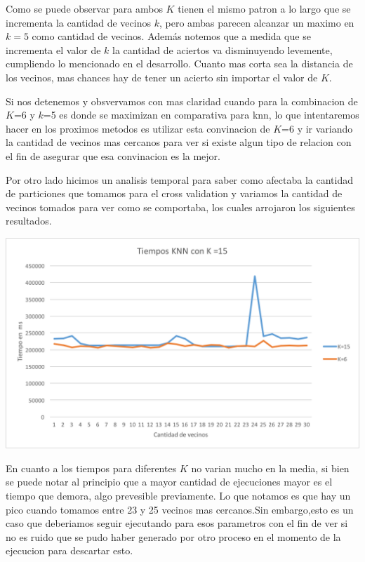 Como se puede observar para ambos $K$ tienen el mismo patron a lo largo que se incrementa la cantidad de vecinos $k$, pero ambas parecen alcanzar un maximo en $k=5$ como cantidad de vecinos. Además notemos que a medida que se incrementa el valor de $k$ la cantidad de aciertos va disminuyendo levemente, cumpliendo lo mencionado en el desarrollo. Cuanto mas corta sea la distancia de los vecinos, mas chances hay de tener un acierto sin importar el valor de $K$.

Si nos detenemos y obsvervamos con mas claridad cuando para la combinacion de $K$=6 y $k$=5 es donde se maximizan en comparativa para knn, lo que intentaremos hacer en los proximos metodos es utilizar esta convinacion de $K$=6 y ir variando la cantidad de vecinos mas cercanos para ver si existe algun tipo de relacion con el fin de asegurar que esa convinacion es la mejor.

Por otro lado hicimos un analisis temporal para saber como afectaba la cantidad de particiones que tomamos para el cross validation y variamos la cantidad de vecinos tomados para ver como se comportaba, los cuales arrojaron los siguientes resultados. 

\begin{center}
\includegraphics[scale=0.6]{imagenes/TiemposKNN.png}
\end{center}

En cuanto a los tiempos para diferentes $K$ no varian mucho en la media, si bien se puede notar al principio que a mayor cantidad de ejecuciones mayor es el tiempo que demora, algo prevesible previamente. Lo que notamos es que hay un pico cuando tomamos entre 23 y 25 vecinos mas cercanos.Sin embargo,esto es un caso que deberiamos seguir ejecutando para esos parametros con el fin de ver si no es ruido que se pudo haber generado por otro proceso en el momento de la ejecucion para descartar esto.


